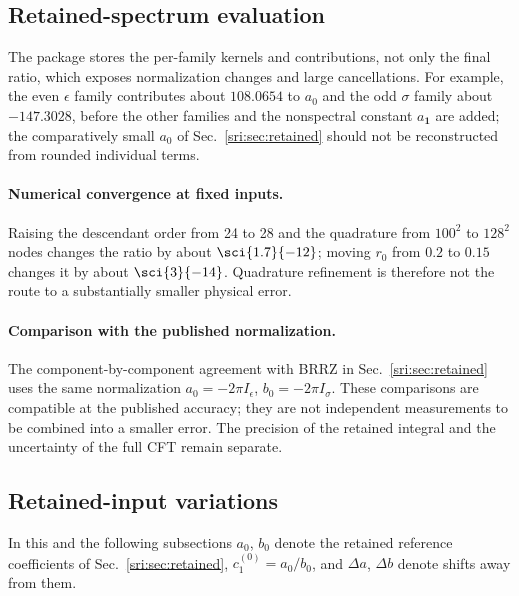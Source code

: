 \subsection{Retained-spectrum evaluation}\label{sri:app:cone:retained}
The package stores the per-family kernels and contributions, not only the final ratio, which exposes normalization
changes and large cancellations. For example, the even $\epsilon$ family contributes about $108.0654$ to $a_0$ and the
odd $\sigma$ family about $-147.3028$, before the other families and the nonspectral constant $a_{\mathbf 1}$ are
added; the comparatively small $a_0$ of Sec.~\ref{sri:sec:retained} should not be reconstructed from rounded individual
terms.

\paragraph{Numerical convergence at fixed inputs.} Raising the descendant order from 24 to 28 and the quadrature from
$100^2$ to $128^2$ nodes changes the ratio by about $\sci{1.7}{-12}$; moving $r_0$ from $0.2$ to $0.15$ changes it by
about $\sci{3}{-14}$. Quadrature refinement is therefore not the route to a substantially smaller physical error.

\paragraph{Comparison with the published normalization.} The component-by-component agreement with BRRZ in
Sec.~\ref{sri:sec:retained} uses the same normalization $a_0=-2\pi I_\epsilon$, $b_0=-2\pi I_\sigma$. These comparisons
are compatible at the published accuracy; they are not independent measurements to be combined into a smaller error.
The precision of the retained integral and the uncertainty of the full CFT remain separate.

\subsection{Retained-input variations}\label{sri:app:cone:variations}
In this and the following subsections $a_0$, $b_0$ denote the retained reference coefficients of
Sec.~\ref{sri:sec:retained}, $c_1^{(0)}=a_0/b_0$, and $\Delta a$, $\Delta b$ denote shifts away from them.

